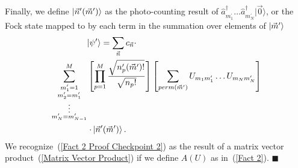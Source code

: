 \documentclass[aps,pra,twocolumn,showpacs,superscriptaddress,floatfix,10pt]{revtex4}
\begin{document}
Finally, we define $\ket{\vec{n}^\prime(\vec{m}^\prime)}$ as the photo-counting result of $\hat{a}_{m_1^\prime}^\dagger \dots \hat{a}_{m_N^\prime}^\dagger |\vec{0} \rangle$, or the Fock state mapped to by each term in the summation over elements of $\ket{\vec{m}^\prime}$
\begin{eqnarray}
\label{Fact 2 Proof Checkpoint 2}
\small \ket{\psi^\prime} = \sum_{\vec{n}} c_{\vec{n}}  \cdot \quad \quad \quad \quad \quad \quad \quad \quad \quad \quad \quad \quad \quad \quad \quad \quad  \\ \sum^M_{\substack{m_1^\prime = 1\\
		m_2^\prime = m_1^\prime\\
		\vdots \\
		m_N^\prime = m_{N-1}^\prime}}
\left[ \prod_{p=1}^{M} \frac{\sqrt{n_p^\prime(\vec{m}^\prime) !}}{ \sqrt{n_p !}} \right] \left[ \sum_{perm(\vec{m}^\prime)} U_{m_1 m_1^\prime} \dots U_{m_N m_N^\prime} \right] \nonumber \\
\cdot \ket{\vec{n}^\prime (\vec{m}^\prime) } . \quad \quad \quad \quad \quad \quad \quad \quad \quad \quad \quad \quad \quad \quad \quad \quad \nonumber
\end{eqnarray}
We recognize~(\ref{Fact 2 Proof Checkpoint 2}) as the result of a matrix vector product~(\ref{Matrix Vector Product}) if we define $A(U)$ as in~(\ref{Fact 2}).  $ \blacksquare $
\end{document}
